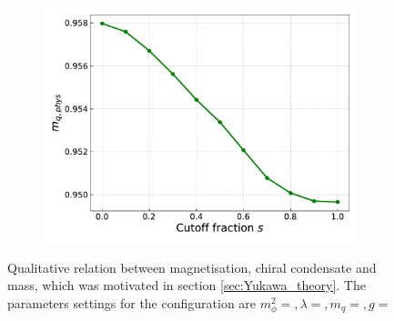 \begin{figure}
\begin{subfigure}[b]{0.48\textwidth}
        \includegraphics[width=1.0\textwidth]{figures/slide_broken/mass.pdf}
    \end{subfigure}
    \caption[Relation between magnetisation, condensate and mass]{Qualitative relation between magnetisation, chiral condensate and mass, which was motivated in section \ref{sec:Yukawa_theory}. The parameters settings for the configuration are $m_\phi^2=, \lambda=, m_q=, g=$}
    \label{fig:interpolation_relation_phi_cond_mass}
\end{figure}
\newpage


